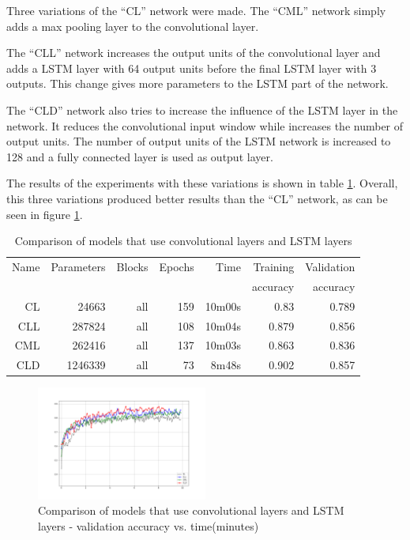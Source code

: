 
Three variations of the ``CL'' network were made.
The ``CML'' network simply adds a max pooling layer to the convolutional layer.

The ``CLL'' network increases the output units of the convolutional layer and adds a LSTM layer with 64 output units before the final LSTM layer with 3 outputs. This change gives more parameters to the LSTM part of the network.

The ``CLD'' network also tries to increase the influence of the LSTM layer in the network. It reduces the convolutional input window while increases the number of output units. The number of output units of the LSTM network is increased to 128 and a fully connected layer is used as output layer.

The results of the experiments with these variations is shown in table \ref{tab:carvingclvariations}.
Overall, this three variations produced better results than the ``CL'' network, as can be seen in figure \ref{fig:cl-variations}.

\begin{table}[!ht]
    \centering
    \caption[CL variations]{Comparison of models that use convolutional layers and LSTM layers}
    \label{tab:carvingclvariations}
\begin{tabular}{r|r|r|r|r|r|r}
\hline
Name & Parameters & Blocks & Epochs & Time    & Training          & Validation          \\       
     &            &        &        &         &          accuracy &            accuracy \\ \hline\hline

CL      & 24663     & all   & 159   & 10m00s    & 0.83  & 0.789 \\\hline
CLL     & 287824    & all   & 108   & 10m04s    & 0.879 & 0.856 \\\hline
CML     & 262416    & all   & 137   & 10m03s    & 0.863 & 0.836 \\\hline
CLD     & 1246339   & all   & 73    & 8m48s     & 0.902 & 0.857 \\\hline
\end{tabular}
\end{table}

\noindent
\begin{figure}[htb!]
\centering\includegraphics[width=0.50\textwidth]{content/CL-CLL-CML-CLD.png}
\caption[CL variations]{\label{fig:cl-variations}Comparison of models that use convolutional layers and LSTM layers - validation accuracy vs. time(minutes)}%
\end{figure}
